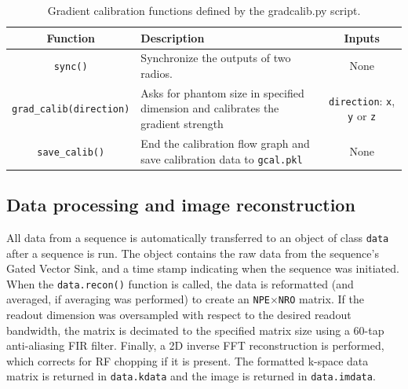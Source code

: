 \documentclass[review]{elsarticle}
\begin{document}
\begin{table}
\begin{tabularx}{\textwidth}{| c | X | c |}
	\hline
	\textbf{Function} & \textbf{Description} & \textbf{Inputs}  \\ \hline
	\texttt{sync()} & Synchronize the outputs of two radios. & None\\ \hline
	\texttt{grad\_calib(direction)} & Asks for phantom size in specified dimension and calibrates the gradient strength & \texttt{direction}: \texttt{x}, \texttt{y} or \texttt{z}\\ \hline
	\texttt{save\_calib()} & End the calibration flow graph and save calibration data to \texttt{gcal.pkl} & None\\ \hline	
\end{tabularx}
\caption{Gradient calibration functions defined by the gradcalib.py script.}
\label{table:gradcalib_functions}
\end{table}


\subsection{Data processing and image reconstruction}
All data from a sequence is automatically transferred to an object of class \texttt{data} after a sequence is run.
The object contains the raw data from the sequence's Gated Vector Sink, 
and a time stamp indicating when the sequence was initiated.
When the \texttt{data.recon()} function is called, the data is reformatted (and averaged, if 
averaging was performed) to create an \texttt{NPE}$\times$\texttt{NRO} matrix. If the 
readout dimension was oversampled with respect to the desired readout bandwidth, the 
matrix is decimated to the specified matrix size using a 60-tap anti-aliasing FIR
filter. Finally, a 2D inverse FFT reconstruction is performed, which corrects for RF 
chopping if it is present. The formatted k-space data matrix is returned in 
\texttt{data.kdata} and the image is returned in \texttt{data.imdata}.


\end{document}
